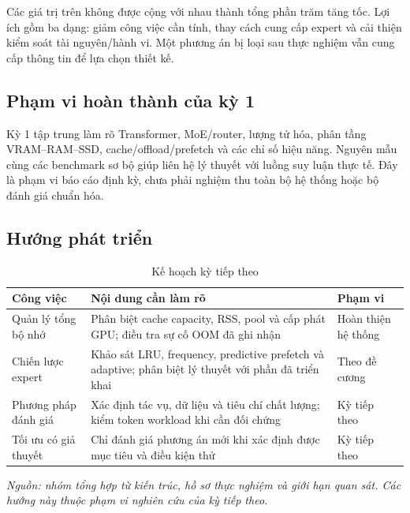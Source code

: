 Các giá trị trên không được cộng với nhau thành tổng phần trăm tăng tốc. Lợi ích gồm ba dạng: giảm công việc cần tính, thay cách cung cấp expert và cải thiện kiểm soát tài nguyên/hành vi. Một phương án bị loại sau thực nghiệm vẫn cung cấp thông tin để lựa chọn thiết kế.

\subsection{Phạm vi hoàn thành của kỳ 1}

Kỳ 1 tập trung làm rõ Transformer, MoE/router, lượng tử hóa, phân tầng VRAM–RAM–SSD, cache/offload/prefetch và các chỉ số hiệu năng. Nguyên mẫu cùng các benchmark sơ bộ giúp liên hệ lý thuyết với luồng suy luận thực tế. Đây là phạm vi báo cáo định kỳ, chưa phải nghiệm thu toàn bộ hệ thống hoặc bộ đánh giá chuẩn hóa.

\subsection{Hướng phát triển}

\begin{table}[htbp]
\centering
\caption{Kế hoạch kỳ tiếp theo}
\small
\setlength{\tabcolsep}{3pt}
\begin{tabularx}{\textwidth}{>{\RaggedRight\arraybackslash}p{3.5cm} >{\RaggedRight\arraybackslash}p{4cm} >{\RaggedRight\arraybackslash}X}
\toprule
\textbf{Công việc} & \textbf{Nội dung cần làm rõ} & \textbf{Phạm vi} \\
\midrule
Quản lý tổng bộ nhớ & Phân biệt cache capacity, RSS, pool và cấp phát GPU; điều tra sự cố OOM đã ghi nhận & Hoàn thiện hệ thống \\
Chiến lược expert & Khảo sát LRU, frequency, predictive prefetch và adaptive; phân biệt lý thuyết với phần đã triển khai & Theo đề cương \\
Phương pháp đánh giá & Xác định tác vụ, dữ liệu và tiêu chí chất lượng; kiểm token workload khi cần đối chứng & Kỳ tiếp theo \\
Tối ưu có giả thuyết & Chỉ đánh giá phương án mới khi xác định được mục tiêu và điều kiện thử & Kỳ tiếp theo \\
\bottomrule
\end{tabularx}

\textit{Nguồn: nhóm tổng hợp từ kiến trúc, hồ sơ thực nghiệm và giới hạn quan sát. Các hướng này thuộc phạm vi nghiên cứu của kỳ tiếp theo.}
\end{table}

